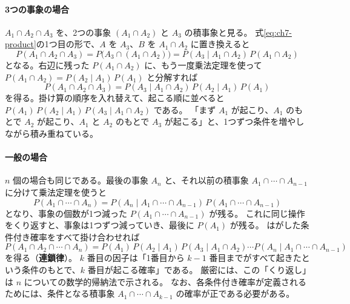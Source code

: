 \paragraph{3つの事象の場合}
$A_1 \cap A_2 \cap A_3$ を、2つの事象 $(A_1 \cap A_2)$ と $A_3$ の積事象と見る。
式\eqref{eq:ch7-product}の1つ目の形で、$A$ を $A_3$、$B$ を $A_1 \cap A_2$ に置き換えると
\begin{equation*}
  P(A_1 \cap A_2 \cap A_3) = P\bigl( A_3 \cap (A_1 \cap A_2) \bigr) = P(A_3 \mid A_1 \cap A_2)\,P(A_1 \cap A_2)
\end{equation*}
となる。右辺に残った $P(A_1 \cap A_2)$ に、もう一度乗法定理を使って $P(A_1 \cap A_2) = P(A_2 \mid A_1)\,P(A_1)$ と分解すれば
\begin{equation*}
  P(A_1 \cap A_2 \cap A_3) = P(A_3 \mid A_1 \cap A_2)\,P(A_2 \mid A_1)\,P(A_1)
\end{equation*}
を得る。掛け算の順序を入れ替えて、起こる順に並べると
$P(A_1)\,P(A_2 \mid A_1)\,P(A_3 \mid A_1 \cap A_2)$ である。
「まず $A_1$ が起こり、$A_1$ のもとで $A_2$ が起こり、$A_1$ と $A_2$ のもとで $A_3$ が起こる」と、1つずつ条件を増やしながら積み重ねている。

\paragraph{一般の場合}
$n$ 個の場合も同じである。最後の事象 $A_n$ と、それ以前の積事象 $A_1 \cap \cdots \cap A_{n-1}$ に分けて乗法定理を使うと
\begin{equation*}
  P(A_1 \cap \cdots \cap A_n) = P(A_n \mid A_1 \cap \cdots \cap A_{n-1})\,P(A_1 \cap \cdots \cap A_{n-1})
\end{equation*}
となり、事象の個数が1つ減った $P(A_1 \cap \cdots \cap A_{n-1})$ が残る。
これに同じ操作をくり返すと、事象は1つずつ減っていき、最後に $P(A_1)$ が残る。
はがした条件付き確率をすべて掛け合わせれば
\begin{equation}
  P(A_1 \cap A_2 \cap \cdots \cap A_n)
  = P(A_1)\,P(A_2 \mid A_1)\,P(A_3 \mid A_1 \cap A_2) \cdots P(A_n \mid A_1 \cap \cdots \cap A_{n-1})
  \label{eq:ch7-chain}
\end{equation}
を得る（\textbf{連鎖律}）。
$k$ 番目の因子は「1番目から $k - 1$ 番目までがすべて起きたという条件のもとで、$k$ 番目が起こる確率」である。
厳密には、この「くり返し」は $n$ についての数学的帰納法で示される。
なお、各条件付き確率が定義されるためには、条件となる積事象 $A_1 \cap \cdots \cap A_{k-1}$ の確率が正である必要がある。

